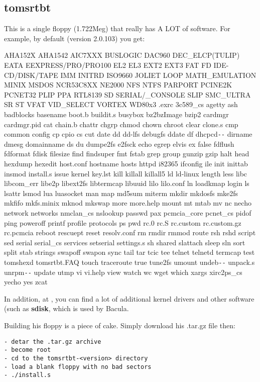 \subsection*{tomsrtbt}

This is a single floppy (1.722Meg) that really has A LOT of software. For
example, by default (version 2.0.103) you get: 

AHA152X AHA1542 AIC7XXX BUSLOGIC DAC960 DEC\_ELCP(TULIP) EATA
EEXPRESS/PRO/PRO100 EL2 EL3 EXT2 EXT3 FAT FD IDE-CD/DISK/TAPE IMM INITRD
ISO9660 JOLIET LOOP MATH\_EMULATION MINIX MSDOS NCR53C8XX NE2000 NFS NTFS
PARPORT PCINE2K PCNET32 PLIP PPA RTL8139 SD SERIAL/\_CONSOLE SLIP SMC\_ULTRA
SR ST VFAT VID\_SELECT VORTEX WD80x3 .exrc 3c589\_cs agetty ash badblocks
basename boot.b buildit.s busybox bz2bzImage bzip2 cardmgr cardmgr.pid cat
chain.b chattr chgrp chmod chown chroot clear clone.s cmp common config cp
cpio cs cut date dd dd-lfs debugfs ddate df dhcpcd\verb{--{ dirname dmesg domainname
ds du dumpe2fs e2fsck echo egrep elvis ex false fdflush fdformat fdisk
filesize find findsuper fmt fstab grep group gunzip gzip halt head hexdump
hexedit host.conf hostname hosts httpd i82365 ifconfig ile init inittab insmod
install.s issue kernel key.lst kill killall killall5 ld ld-linux length less
libc libcom\_err libe2p libext2fs libtermcap libuuid lilo lilo.conf ln
loadkmap login ls lsattr lsmod lua luasocket man map md5sum miterm mkdir
mkdosfs mke2fs mkfifo mkfs.minix mknod mkswap more more.help mount mt mtab mv
nc necho network networks nmclan\_cs nslookup passwd pax pcmcia\_core
pcnet\_cs pidof ping poweroff printf profile protocols ps pwd rc.0 rc.S
rc.custom rc.custom.gz rc.pcmcia reboot rescuept reset resolv.conf rm rmdir
rmmod route rsh rshd script sed serial serial\_cs services setserial
settings.s sh shared slattach sleep sln sort split stab strings swapoff swapon
sync tail tar tcic tee telnet telnetd termcap test tomshexd tomsrtbt.FAQ touch
traceroute true tune2fs umount undeb\verb{--{ unpack.s unrpm\verb{--{ update utmp vi vi.help
view watch wc wget which xargs xirc2ps\_cs yecho yes zcat 

In addition, at 
, you can find a lot of
additional kernel drivers and other software (such as {\bf sdisk}, which is
used by Bacula. 

Building his floppy is a piece of cake. Simply download his .tar.gz file then:


\footnotesize
\begin{verbatim}
- detar the .tar.gz archive
- become root
- cd to the tomsrtbt-<version> directory
- load a blank floppy with no bad sectors
- ./install.s
\end{verbatim}
\normalsize
